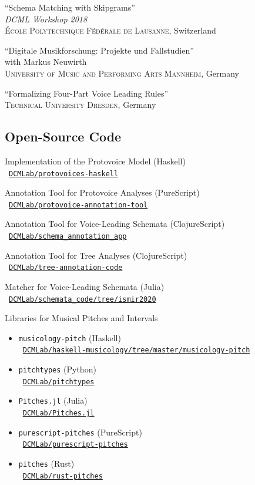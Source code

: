 \documentclass[10pt]{scrartcl}
\newcommand{\margintext}[1]{\marginpar{\raggedleft\itshape\small#1}}
\newcommand{\entry}[1]{\vphantom{x}\margintext{#1}}
\begin{document}
\invited \enquote{Schema Matching with Skipgrams}
\\
\textit{DCML Workshop 2018}\\
\textsc{École Polytechnique Fédérale de Lausanne}, Switzerland

\invited \enquote{Digitale Musikforschung: Projekte und Fallstudien}
\\
with Markus Neuwirth\\
\textsc{University of Music and Performing Arts Mannheim}, Germany

\entry{2017}%
\invited \enquote{Formalizing Four-Part Voice Leading Rules}
\\
\textsc{Technical University Dresden}, Germany

\subsection*{Open-Source Code}

\newcommand{\codelink}[1]{\faCodeFork\ \href{https://#1}{\nolinkurl{#1}}}
\newcommand{\ghlink}[1]{\faGithub\ \href{https://github.com/#1}{\nolinkurl{#1}}}

Implementation of the Protovoice Model (Haskell)\\
\ghlink{DCMLab/protovoices-haskell}

Annotation Tool for Protovoice Analyses (PureScript)\\
\ghlink{DCMLab/protovoice-annotation-tool}

Annotation Tool for Voice-Leading Schemata (ClojureScript)\\
\ghlink{DCMLab/schema_annotation_app}

Annotation Tool for Tree Analyses (ClojureScript)\\
\ghlink{DCMLab/tree-annotation-code}

Matcher for Voice-Leading Schemata (Julia)\\
\ghlink{DCMLab/schemata_code/tree/ismir2020}

Libraries for Musical Pitches and Intervals
\begin{itemize}
\item \texttt{musicology-pitch} (Haskell)\\
  \ghlink{DCMLab/haskell-musicology/tree/master/musicology-pitch}
\item \texttt{pitchtypes} (Python)\\
  \ghlink{DCMLab/pitchtypes}
\item \texttt{Pitches.jl} (Julia)\\
  \ghlink{DCMLab/Pitches.jl}
\item \texttt{purescript-pitches} (PureScript)\\
  \ghlink{DCMLab/purescript-pitches}
\item \texttt{pitches} (Rust)\\
  \ghlink{DCMLab/rust-pitches}
\end{itemize}
\end{document}
